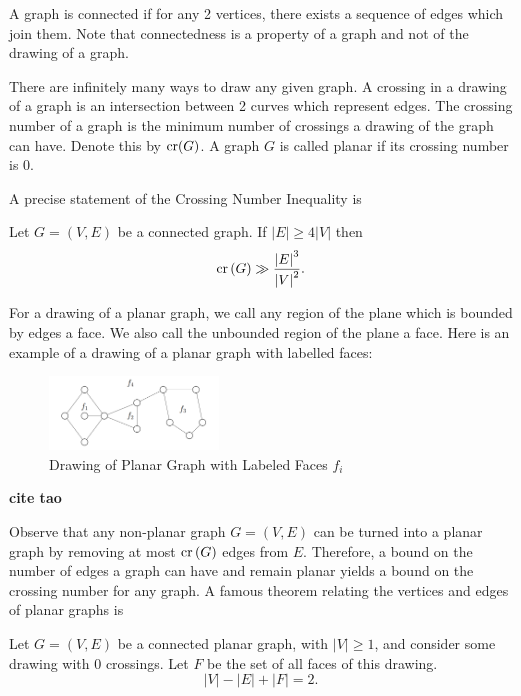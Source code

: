 \documentclass[12pt,reqno]{amsart}
\begin{document}
A graph is connected if for any 2 vertices, there exists a sequence of edges which join them.
Note that connectedness is a property of a graph and not of the drawing of a graph.

There are infinitely many ways to draw any given graph. A crossing in a drawing
of a graph is an intersection between 2 curves which represent edges. The 
crossing number of a graph is the minimum number of crossings a drawing
of the graph can have. Denote this by
\(\operatorname{cr}(G)\). A graph \(G\) is called planar if its crossing number is 0.

A precise statement of the Crossing Number Inequality is

\begin{theorem}\label{thm:crossing-number-inequality}
    Let \(G = (V,E)\) be a connected graph. If \(\left\lvert E \right\rvert \geq 4 \left\lvert V \right\rvert \)
    then
    \[
        \operatorname{cr}\left( G \right) \gg \frac{\left\lvert E \right\rvert ^{3} }{\left\lvert V \right\rvert ^{2}}  
    .\]
\end{theorem}

For a drawing of a planar graph, we call any region of the plane which is bounded by edges a face. We also call
the unbounded region of the plane a face. Here is an example of a drawing of a planar
graph with labelled faces:

\begin{figure}[h]
    \centering
    \includegraphics[width=0.4\textwidth]{faceimage.png}
    \caption{Drawing of Planar Graph with Labeled Faces \(f_{i} \)}
\end{figure}

\textbf{cite tao }

Observe that any non-planar graph \(G = (V,E)\) can be turned into a planar graph by removing at most
\(\operatorname{cr}\left( G \right) \) edges from \(E\). Therefore, a bound on the number of
edges a graph can have and remain planar yields a bound on the crossing number for any graph.
A famous theorem relating the vertices and edges of planar graphs is

\begin{theorem}\label{thm:euler-formula-graphs}
Let \(G = (V,E)\) be a connected planar graph, with \(\left\lvert V \right\rvert \geq 1\), and consider some drawing with 0 crossings.
Let \(F\) be the set of all faces of this drawing.
\[
    \left\lvert V \right\rvert - \left\lvert E \right\rvert + \left\lvert F \right\rvert = 2
.\]
\end{theorem}
\end{document}
